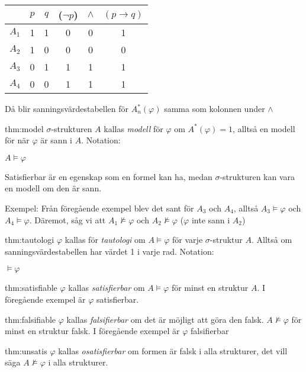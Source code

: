 \begin{center}
  \begin{tabular}{|c|c|c|c|c|c|}
    \hline
    &$p$&$q$&($\neg p$)&$\wedge$&$(p\rightarrow q)$\\
    \hline
     $A_1$&1&1&0&0&1\\
    \hline
     $A_2$&1&0&0&0&0\\
    \hline
     $A_3$&0&1&1&1&1\\
    \hline
     $A_4$&0&0&1&1&1\\
    \hline
  \end{tabular}
\end{center}
\par\bigskip
\noindent Då blir sanningsvärdestabellen för $A_n^*(\varphi)$ samma som kolonnen under $\wedge$
\par\bigskip
\begin{theo}{thm:model}
  $\sigma$-strukturen $A$ kallas \textit{modell} för $\varphi$ om $A^*(\varphi)=1$, alltså en modell för när $\varphi$ är sann i $A$. Notation:
  \par\bigskip
  $A\vDash\varphi$
  \par\bigskip
  \noindent Satisfierbar är en egenskap som en formel kan ha, medan $\sigma$-strukturen kan vara en modell om den är sann.
\end{theo}
\par\bigskip
\noindent Exempel: Från föregående exempel blev det sant för $A_3$ och $A_4$, alltså $A_3\vDash\varphi$ och $A_4\vDash\varphi$. Däremot, såg vi att $A_1\nvDash\varphi$ och $A_2\nvDash\varphi$ ($\varphi$ inte sann i $A_2$)
\par\bigskip
\begin{theo}[Tautologi]{thm:tautologi}
  $\varphi$ kallas för \textit{tautologi} om $A\vDash\varphi$ för varje $\sigma$-struktur $A$. Alltså om sanningsvärdestabellen har värdet 1 i varje rad. Notation:
  \par\bigskip
  $\vDash\varphi$
\end{theo}
\par\bigskip
\begin{theo}[Satisfierbar]{thm:satisfiable}
  $\varphi$ kallas \textit{satisfierbar} om $A\vDash\varphi$ för minst en struktur $A$. I föregående exempel är $\varphi$ satisfierbar.
\end{theo}
\par\bigskip
\begin{theo}[Falsifierbar]{thm:falsifiable}
  $\varphi$ kallas \textit{falsifierbar} om det är möjligt att göra den falsk. $A\nvDash\varphi$ för minst en struktur falsk. I föregående exempel är $\varphi$ falsifierbar
\end{theo}
\par\bigskip
\begin{theo}[Osatisfierbar]{thm:unsatis}
  $\varphi$ kallas \textit{osatisfierbar} om formen är falsk i alla strukturer, det vill säga $A\nvDash\varphi$ i alla strukturer.
\end{theo}

